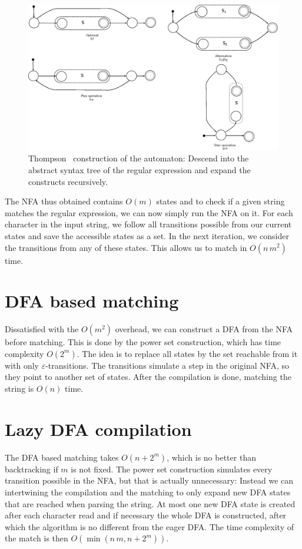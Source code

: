 \documentclass[11pt,a4paper,twoside,openright]{Thesis}
\theoremstyle{definition}
\begin{document}
\begin{figure}[htb] \includegraphics[width=\linewidth]{graphs/thompson-simple}
  \caption[Thompson construction]{Thompson~\cite{Thom68a} construction of the
automaton: Descend into the abstract syntax tree of the regular
expression and expand the constructs recursively.}
\label{fig:thompson-construction-simple}
\end{figure}

The NFA thus obtained contains $O(m)$ states and to check if a given string
matches the regular expression, we can now simply run the NFA on it. For each
character in the input string, we follow all transitions possible from our
current states and save the accessible states as a set. In the next
iteration, we consider the transitions from any of these states. This allows
us to match in $O(n\, m^2)$ time.

\section{DFA based matching}\label{sec:dfa-match}
Dissatisfied with the $O(m^2)$ overhead, we can construct a DFA from the NFA
before matching. This is done by the power set construction\cite{Sips05a},
which has time complexity $O(2^m)$. The idea is to replace all states by the
set reachable from it with only $\varepsilon$-transitions. The transitions
simulate a step in the original NFA, so they point to another set of states.
After the compilation is done, matching the string is $O(n)$ time.

\section{Lazy DFA compilation}\label{sec:lazy-dfa-match}
The DFA based matching takes $O(n + 2^m)$, which is no better than backtracking
if $m$ is not fixed. The power set construction simulates every transition
possible in the NFA, but that is actually unnecessary: Instead we can
intertwining the compilation and the matching to only expand new DFA states that
are reached when parsing the string. At most one new DFA state is created after
each character read and if necessary the whole DFA is constructed, after
which the algorithm is no different from the eager DFA\@. The time complexity of
the match is then $O(\min(n\, m, n+2^m))$.
\end{document}
